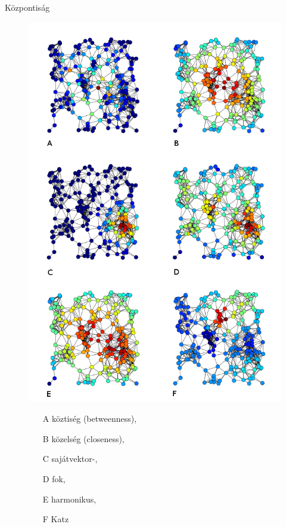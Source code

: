 \documentclass{beamer}
\newlength{\onecolwid}
\begin{document}
\begin{frame}[t]
\begin{columns}[t]
      \begin{column}{\onecolwid} %
        \begin{block}{Központiság}
          \begin{figure}
            \includegraphics{6_centrality_measures}
            \begin{itemize}
              \item[A] köztiség (betweenness),
              \item[B] közelség (closeness),
              \item[C] sajátvektor-,
              \item[D] fok,
              \item[E] harmonikus,
              \item[F] Katz
            \end{itemize}
          \end{figure}
        \end{block}



\end{column}
\end{columns}
\end{frame}
\end{document}
